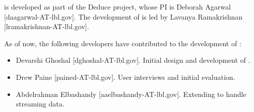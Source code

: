 \systemname is developed as part of the Deduce project,
whose PI is Deborah Agarwal [daagarwal-AT-lbl.gov]. The
development of \systemname is led by Lavanya Ramakrishnan
[lramakrishnan-AT-lbl.gov].

As of now, the following developers have contributed to
the development of \systemname:
\begin{itemize}
\item Devarshi Ghoshal [dghoshal-AT-lbl.gov].
 Initial design and development of \systemname.
\item Drew Paine [pained-AT-lbl.gov].
 User interviews and initial evaluation.
\item Abdelrahman Elbashandy [aaelbashandy-AT-lbl.gov].
 Extending \systemname to handle streaming data.
\end{itemize}

